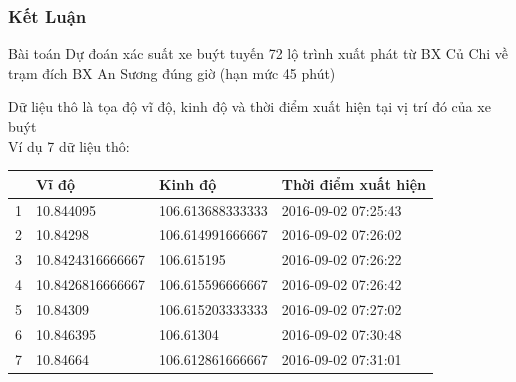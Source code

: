 \documentclass[t]{beamer}
\begin{document}

\begin{frame}
\frametitle{Kết Luận}
\begin{block}{Bài toán}
Dự đoán xác suất xe buýt tuyến 72 lộ trình xuất phát từ BX Củ Chi về trạm đích BX An Sương đúng giờ (hạn mức 45 phút)
\end{block}
Dữ liệu thô là tọa độ vĩ độ, kinh độ và thời điểm xuất hiện tại vị trí đó của xe buýt\\
Ví dụ 7 dữ liệu thô:\\
\begin{flushleft}
\begin{tabular}{ |l|l|l|l| }
\hline
&Vĩ độ & Kinh độ & Thời điểm xuất hiện \\ 
\hline
1&10.844095 & 106.613688333333 & 2016-09-02 07:25:43 \\ 
\hline
2&10.84298 & 106.614991666667 & 2016-09-02 07:26:02 \\
\hline
3&10.8424316666667 & 106.615195 & 2016-09-02 07:26:22 \\
\hline
4&10.8426816666667 & 106.615596666667 & 2016-09-02 07:26:42 \\
\hline
5&10.84309 & 106.615203333333 & 2016-09-02 07:27:02 \\
\hline
6&10.846395 & 106.61304 & 2016-09-02 07:30:48 \\
\hline
7&10.84664 & 106.612861666667 & 2016-09-02 07:31:01 \\
\hline 
\end{tabular}
\end{flushleft}
\end{frame}

\end{document}

